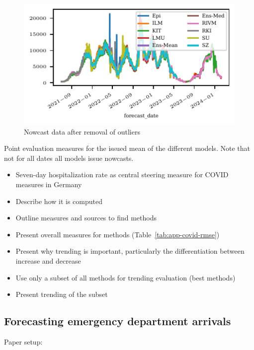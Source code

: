 \begin{figure}
    \centering
    \includegraphics{plots/covid_nowcast/01_nowcast_data_without_outliers.pdf}
    \caption{Nowcast data after removal of outliers}
    \label{fig:app-covid-nowcast-no-outliers}
\end{figure}

\begin{table}[]
    \centering
    
    \caption{Point evaluation measures for the issued mean of the different models. Note that not for all dates all models issue nowcasts.}
    \label{tab:app-covid-rmse}
\end{table}

\begin{itemize}
    \item Seven-day hospitalization rate as central steering measure for COVID measures in Germany
    \item Describe how it is computed
    \item Outline measures and sources to find methods
    \item Present overall measures for methods (Table~\ref{tab:app-covid-rmse})
    \item Present why trending is important, particularly the differentiation between increase and decrease
    \item Use only a subset of all methods for trending evaluation (best methods)
    \item Present trending of the subset
\end{itemize}
\subsection{Forecasting emergency department arrivals}

\textcite{Rostami-Tabar2023}

Paper setup:

